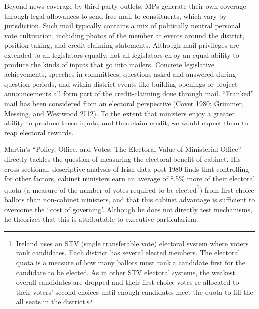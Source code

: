 \documentclass[letter,12pt]{article}
\begin{document}
Beyond news coverage by third party outlets, MPs generate their own coverage through legal allowances to send free mail to constituents, which vary by jurisdiction. Such mail typically contains a mix of politically neutral personal vote cultivation, including photos of the member at events around the district, position-taking, and credit-claiming statements. Although mail privileges are extended to all legislators equally, not all legislators enjoy an equal ability to produce the kinds of inputs that go into mailers. Concrete legislative achievements, speeches in committees, questions asked and answered during question periods, and within-district events like building openings or project announcements all form part of the credit-claiming done through mail. ``Franked'' mail has been considered from an electoral perspective (Cover 1980; Grimmer, Messing, and Westwood 2012). To the extent that ministers enjoy a greater ability to produce these inputs, and thus claim credit, we would expect them to reap electoral rewards.

Martin's ``Policy, Office, and Votes: The Electoral Value of Ministerial Office'' directly tackles the question of measuring the electoral benefit of cabinet. His cross-sectional, descriptive analysis of Irish data post-1980 finds that controlling for other factors, cabinet ministers earn an average of 8.5\% more of their electoral quota (a measure of the number of votes required to be elected\footnote{Ireland uses an STV (single transferable vote) electoral system where voters rank candidates. Each district has several elected members. The electoral quota is a measure of how many ballots must rank a candidate first for the candidate to be elected. As in other STV electoral systems, the weakest overall candidates are dropped and their first-choice votes re-allocated to their voters' second choices until enough candidates meet the quota to fill the all seats in the district.}) from first-choice ballots than non-cabinet ministers, and that this cabinet advantage is sufficient to overcome the ``cost of governing'. Although he does not directly test mechanisms, he theorizes that this is attributable to executive particularism.
\end{document}
